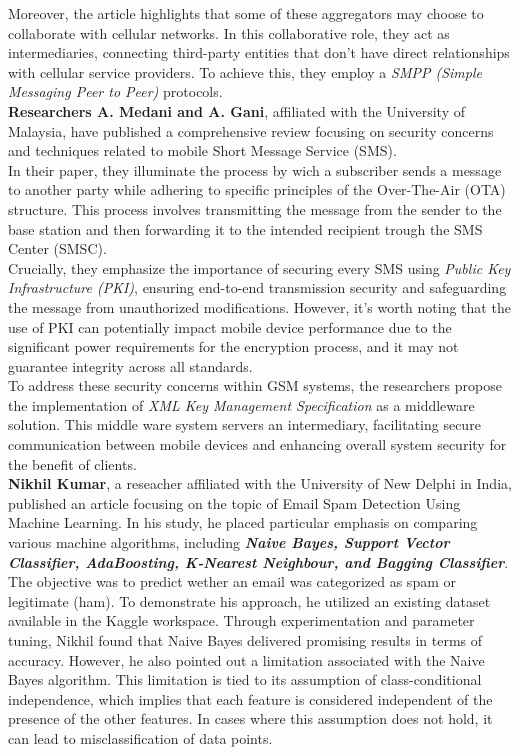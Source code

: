 \documentclass[12pt,a4paper, oneside]{book}
\begin{document}
	Moreover, the article highlights that some of these aggregators may choose to collaborate with cellular networks. In this collaborative role, they act as intermediaries, connecting third-party entities that don't have direct relationships with cellular service providers. To achieve this, they employ a \textit{SMPP (Simple Messaging Peer to Peer)} protocols.\\
	
	\cite{medani2011review} \textbf{Researchers A. Medani and A. Gani}, affiliated with the University of Malaysia, have published a comprehensive review focusing on security concerns and techniques related to mobile Short Message Service (SMS).\\
	
	In their paper, they illuminate the process by wich a subscriber sends a message to another party while adhering to specific principles of the Over-The-Air (OTA) structure. This process involves transmitting the message from the sender to the base station and then forwarding it to the intended recipient trough the SMS Center (SMSC).\\
	
	Crucially, they emphasize the importance of securing every SMS using \textit{Public Key Infrastructure (PKI)}, ensuring end-to-end transmission security and safeguarding the message from unauthorized modifications. However, it's worth noting that the use of PKI can potentially impact mobile device performance due to the significant power requirements for the encryption process, and it may not guarantee integrity across all standards.\\
	
	To address these security concerns within GSM systems, the researchers propose the implementation of \textit{XML Key Management Specification} as a middleware solution. This middle ware system servers an intermediary, facilitating secure communication between mobile devices and enhancing overall system security for the benefit of clients.\\
	
	
	\cite{crawford2015survey} \textbf{Nikhil Kumar}, a reseacher affiliated with the University of New Delphi in India, published an article focusing on the topic of Email Spam Detection Using Machine Learning. In his study, he placed particular emphasis on comparing various machine algorithms, including \textbf{\textit{Naive Bayes, Support Vector Classifier, AdaBoosting, K-Nearest Neighbour, and Bagging Classifier}}. The objective was to predict wether an email was categorized as spam or legitimate (ham). To demonstrate his approach, he utilized an existing dataset available in the Kaggle workspace.\newline	
	Through experimentation and parameter tuning, Nikhil found that Naive Bayes delivered promising results in terms of accuracy. However, he also pointed out a limitation associated with the Naive Bayes algorithm. This limitation is tied to its assumption of class-conditional independence, which implies that each feature is considered independent of the presence of the other features. In cases where this assumption does not hold, it can lead to misclassification of data points.
	
\end{document}

